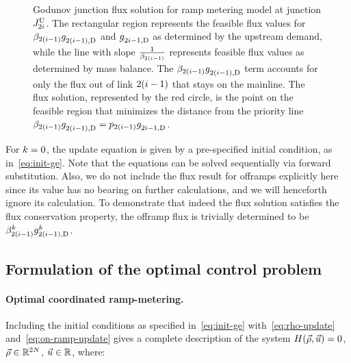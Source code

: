 \begin{figure}
								\caption{Godunov junction flux solution for ramp metering model at junction
									$J_{2i}^{\text{U}}$. The rectangular region represents the feasible flux
									values for $\splitratio_{2\left(\link-1\right)}\fout{2\left(\link-1\right)}{}$
									and $g_{2i-1,\text{D}}^{}$ as determined by the upstream demand, while
									the line with slope\label{fig:Godunov-junction-flux} $\frac{1}{\splitratio_{2\left(\link-1\right)}}$
									represents feasible flux values as determined by mass balance. The
									$\splitratio_{2\left(\link-1\right)}\fout{2\left(\link-1\right)}{}$
									term accounts for only the flux out of link $2\left(\link-1\right)$
									that stays on the mainline. The flux solution, represented by the
									red circle, is the point on the feasible region that minimizes the
									distance from the priority line $\splitratio_{2\left(\link-1\right)}\fout{2\left(\link-1\right)}{}=p_{2(\link-1)}\fout{2\link-1}{}$.}
							\end{figure}
														
														
							For $k=0$, the update equation is given by a pre-specified initial
							condition, as in~\eqref{eq:init-ge}. Note that the equations can
							be solved sequentially via forward substitution. Also, we do not include
							the flux result for offramps explicitly here since its value has no
							bearing on further calculations, and we will henceforth ignore its
							calculation. To demonstrate that indeed the flux solution satisfies
							the flux conservation property, the offramp flux is trivially determined
							to be $\splitratio_{2\left(\link-1\right)}^{\tind}\fout{2\left(\link-1\right)}{\tind}$.
														
														
							\subsection{Formulation of the optimal control problem}
														
														
							\paragraph{Optimal coordinated ramp-metering.}
														
							Including the initial conditions as specified in~\eqref{eq:init-ge}
							with~\eqref{eq:rho-update} and~\eqref{eq:on-ramp-update} gives
							a complete description of the system $\sys\left(\state,\control\right)=0$,
							$\vec{\rho}\in\mathbb{R}^{2N}$, $\vec{u}\in\mathbb{R}$, where:
														
